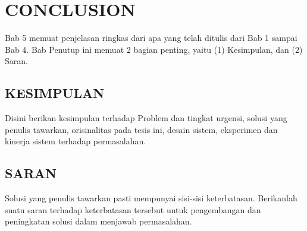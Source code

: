 \chapter{CONCLUSION}
Bab 5 memuat penjelasan ringkas dari apa yang telah ditulis dari Bab 1 sampai Bab 4. Bab Penutup ini memuat 2 bagian penting, yaitu (1) Kesimpulan, dan (2) Saran.
\section{KESIMPULAN}
Disini berikan kesimpulan terhadap Problem dan tingkat urgensi, solusi yang penulis tawarkan, orisinalitas pada tesis ini, desain sistem, eksperimen dan kinerja sistem terhadap permasalahan.
\section{SARAN}
Solusi yang penulis tawarkan pasti mempunyai sisi-sisi keterbatasan. Berikanlah suatu saran terhadap keterbatasan tersebut untuk pengembangan dan peningkatan solusi dalam menjawab permasalahan.
